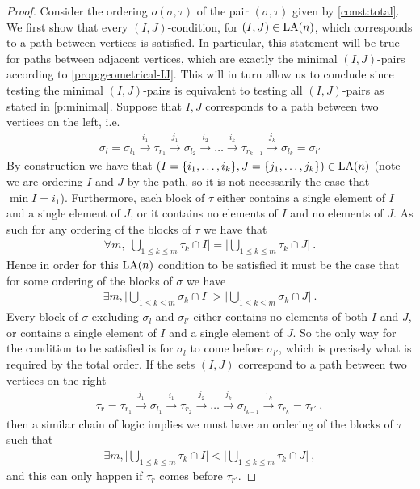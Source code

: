 \begin{proof}
Consider the ordering $o(\sigma,\tau)$ of the pair $(\sigma,\tau)$ given by \cref{const:total}. 
We first show that every $(I,J)$-condition, for $(I,J) \in \mathrm{LA}(n)$, which corresponds to a path between vertices is satisfied. 
In particular, this statement will be true for paths between adjacent vertices, which are exactly the minimal $(I,J)$-pairs according to \cref{prop:geometrical-IJ}.
This will in turn allow us to conclude since testing the minimal $(I,J)$-pairs is equivalent to testing all $(I,J)$-pairs as stated in \cref{p:minimal}. 
Suppose that $I,J$ corresponds to a path between two vertices on the left, i.e.
\begin{align*}
    \sigma_l = \sigma_{l_1} \xrightarrow{i_1} \tau_{r_1}\xrightarrow{j_1} \sigma_{l_2} \xrightarrow{i_2}\dots \xrightarrow{i_{k}} \tau_{r_{k-1}} \xrightarrow{j_k} \sigma_{l_k}= \sigma_{l'}
\end{align*}
By construction we have that $(I = \{i_1,\dots,i_k\},J=\{j_1,\dots,j_k\}) \in \mathrm{LA}(n)$ (note we are ordering $I$ and $J$ by the path, so it is not necessarily the case that $\min I = i_1$). 
Furthermore, each block of $\tau$ either contains a single element of $I$ and a single element of $J$, or it contains no elements of $I$ and no elements of $J$. 
As such for any ordering of the blocks of $\tau$ we have that
\begin{align*}
    \forall m, \bigg|\bigcup_{1\leq k \leq m} \tau_{k} \cap I \bigg| = \bigg|\bigcup_{1\leq k \leq m} \tau_{k} \cap J \bigg| \ .
\end{align*}
Hence in order for this $\mathrm{LA}(n)$ condition to be satisfied it must be the case that for some ordering of the blocks of $\sigma$ we have
\begin{align*}
    \exists m, \bigg| \bigcup_{1\leq k \leq m} \sigma_k \cap I \bigg| > \bigg|\bigcup_{1\leq k \leq m} \sigma_k \cap J \bigg| \ .
\end{align*}
Every block of $\sigma$ excluding $\sigma_l$ and $\sigma_{l'}$ either contains no elements of both $I$ and $J$, or contains a single element of $I$ and a single element of $J$. 
So the only way for the condition to be satisfied is for $\sigma_l$ to come before $\sigma_{l'}$, which is precisely what is required by the total order.
If the sets $(I,J)$ correspond to a path between two vertices on the right
\begin{align*}
    \tau_r = \tau_{r_1} \xrightarrow{j_1} \sigma_{l_1}\xrightarrow{i_1} \tau_{r_2} \xrightarrow{j_2}\dots \xrightarrow{j_{k}} \sigma_{l_{k-1}} \xrightarrow{1_k} \tau_{r_k}=\tau_{r'} \ ,
\end{align*}
then a similar chain of logic implies we must have an ordering of the blocks of $\tau$ such that
\begin{align*}
    \exists m, \bigg|\bigcup_{1\leq k \leq m}\tau_k \cap I\bigg| < \bigg|\bigcup_{1\leq k \leq m} \tau_k \cap J\bigg| \ , 
\end{align*}
and this can only happen if $\tau_r$ comes before $\tau_{r'}$.
\end{proof}

